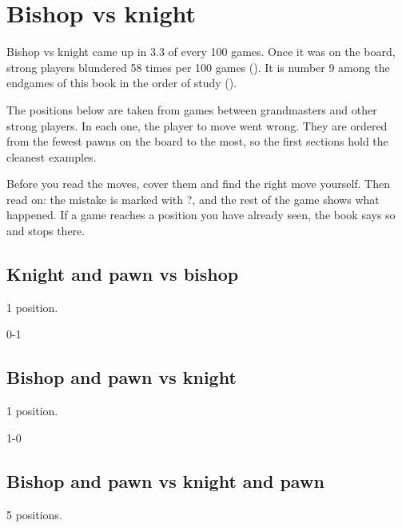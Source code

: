 \chapter{Bishop vs knight}\label{ch:bishop-vs-knight}
Bishop vs knight came up in 3.3 of every 100 games. Once it was on the board, strong players blundered 58 times per 100 games (). It is number 9 among the endgames of this book in the order of study ().

The positions below are taken from games between grandmasters and other strong players. In each one, the player to move went wrong. They are ordered from the fewest pawns on the board to the most, so the first sections hold the cleanest examples.

Before you read the moves, cover them and find the right move yourself. Then read on: the mistake is marked with ?, and the rest of the game shows what happened. If a game reaches a position you have already seen, the book says so and stops there.


\section{Knight and pawn vs bishop}
1 position.


0-1\par
\section{Bishop and pawn vs knight}
1 position.


1-0\par
\section{Bishop and pawn vs knight and pawn}
5 positions.


